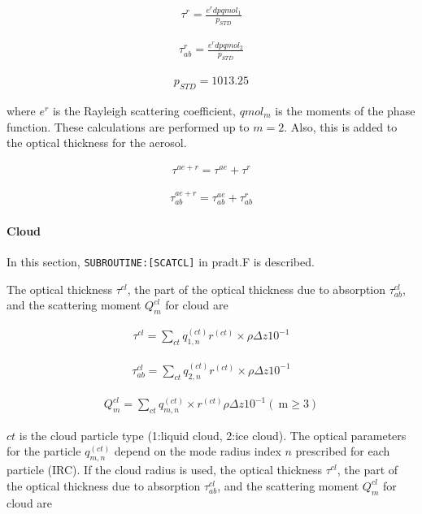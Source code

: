 \begin{eqnarray}
\tau^{r}=\frac{e^{r} d p q m o l_{1}}{p_{S T D}}
\end{eqnarray}

\begin{eqnarray}
\tau_{ab}^{r}=\frac{e^{r} d p q m o l_{2}}{p_{S T D}}
\end{eqnarray}

\begin{eqnarray}
p_{S T D}=1013.25
\end{eqnarray}

where \(e^{r}\) is the Rayleigh scattering coefficient, \(qmol_m\) is
the moments of the phase function. These calculations are performed up
to \(m=2\). Also, this is added to the optical thickness for the
aerosol.

\begin{eqnarray}
\tau^{a e+r}=\tau^{a e}+\tau^{r}
\end{eqnarray}

\begin{eqnarray}
\tau_{ab}^{a e+r}=\tau_{ab}^{a e}+\tau_{ab}^{r}
\end{eqnarray}

\hypertarget{cloud}{%
\paragraph{Cloud}\label{cloud}}

In this section, \texttt{SUBROUTINE:{[}SCATCL{]}} in pradt.F is
described.

The optical thickness \(\tau^{cl}\), the part of the optical thickness
due to absorption \(\tau_{ab}^{cl}\), and the scattering moment
\(Q_{m}^{c l}\) for cloud are

\begin{eqnarray}
\tau^{c l}=\sum_{c t} q_{1, n}^{(c t)}r^{(c t)}\times \rho \Delta z 10^{-1}
\end{eqnarray}

\begin{eqnarray}
\tau_{ab}^{c l}=\sum_{c t} q_{2, n}^{(c t)}r^{(c t)}\times \rho \Delta z 10^{-1}
\end{eqnarray}

\begin{eqnarray}
Q_{m}^{c l}=\sum_{c t} q_{m, n}^{(c t)} \times r^{(c t)} \rho \Delta z 10^{-1}(\mathrm{~m} \geq 3)
\end{eqnarray}

\(ct\) is the cloud particle type (1:liquid cloud, 2:ice cloud). The
optical parameters for the particle \(q_{m, n}^{(c t)}\) depend on the
mode radius index \(n\) prescribed for each particle (IRC). If the cloud
radius is used, the optical thickness \(\tau^{cl}\), the part of the
optical thickness due to absorption \(\tau_{ab}^{cl}\), and the
scattering moment \(Q_{m}^{c l}\) for cloud are

